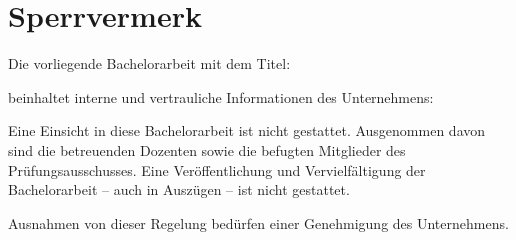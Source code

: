 \section*{Sperrvermerk}
\vspace*{0.7cm}

Die vorliegende Bachelorarbeit mit dem Titel:
\vspace*{0.7cm}

\titel


\vspace*{0.7cm}
beinhaltet interne und vertrauliche Informationen des Unternehmens:
\vspace*{0.7cm}

\institutioneins

\vspace*{0.7cm}
Eine Einsicht in diese Bachelorarbeit ist nicht gestattet. Ausgenommen davon sind die betreuenden Dozenten sowie die befugten Mitglieder des Prüfungsausschusses. Eine Veröffentlichung und Vervielfältigung der Bachelorarbeit – auch in Auszügen – ist nicht gestattet.

\vspace*{0.7cm}

Ausnahmen von dieser Regelung bedürfen einer Genehmigung des Unternehmens.